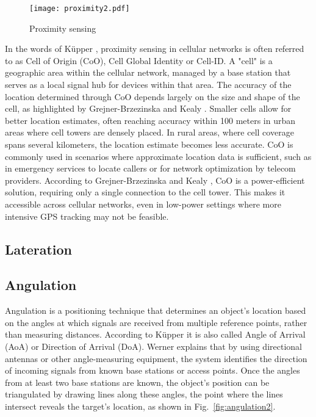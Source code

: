 \begin{figure}[htbp]
    \centering
    \texttt{[image: proximity2.pdf]}
    \caption{Proximity sensing \cite{militaru2024positioning}}
    \label{fig:proximity2}
\end{figure}

In the words of K\"upper \cite{kupper2005location}, proximity sensing in cellular networks is often referred to as Cell of Origin (CoO), Cell Global Identity or Cell-ID. 
A "cell" is a geographic area within the cellular network, managed by a base station that serves as a local signal hub for devices within that area. 
The accuracy of the location determined through CoO depends largely on the size and shape of the cell, as highlighted by Grejner-Brzezinska and Kealy \cite{grejner2004positioning}. 
Smaller cells allow for better location estimates, often reaching accuracy within 100 meters in urban areas where cell towers are densely placed. 
In rural areas, where cell coverage spans several kilometers, the location estimate becomes less accurate.
CoO is commonly used in scenarios where approximate location data is sufficient, such as in emergency services to locate callers or for network optimization by telecom providers. According to Grejner-Brzezinska and Kealy \cite{grejner2004positioning}, CoO is a power-efficient solution, requiring only a single connection to the cell tower. This makes it accessible across cellular networks, even in low-power settings where more intensive GPS tracking may not be feasible.

\subsection{Lateration}
\subsection{Angulation}
Angulation is a positioning technique that determines an object's location based on the angles at which signals are received from multiple reference points, rather than measuring distances. According to K\"upper \cite{kupper2005location} it is also called Angle of Arrival (AoA) or Direction of Arrival (DoA). Werner \cite{werner2014indoor} explains that by using directional antennas or other angle-measuring equipment, the system identifies the direction of incoming signals from known base stations or access points. Once the angles from at least two base stations are known, the object's position can be triangulated by drawing lines along these angles, the point where the lines intersect reveals the target's location, as shown in Fig.~\ref{fig:angulation2}.

